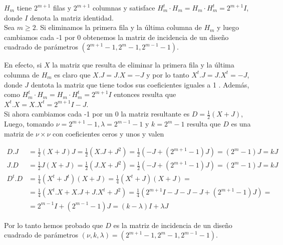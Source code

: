 \documentclass[10pt]{article}
\begin{document}
$H_{m}$ tiene $2^{m+1}$ filas y $2^{m+1}$ columnas y satisface $H_{m}^{t} \cdot H_{m}=H_{m} \cdot H_{m}^{t}=2^{m+1} I$, donde $I$ denota la matriz identidad.\\
Sea $m \geq 2$. Si eliminamos la primera fila y la última columna de $H_{m}$ y luego cambiamos cada -1 por 0 obtenemos la matriz de incidencia de un diseño cuadrado de parámetros $\left(2^{m+1}-1,2^{m}-1,2^{m-1}-1\right)$.

En efecto, si $X$ la matriz que resulta de eliminar la primera fila y la última columna de $H_{m}$ es claro que $X . J=J . X=-J$ y por lo tanto $X^{t} . J=J . X^{t}=-J$, donde $J$ dentota la matriz que tiene todos sus coeficientes iguales a 1 . Además, como $H_{m}^{t} \cdot H_{m}=H_{m} \cdot H_{m}^{t}=2^{m+1} I$ entonces resulta que $X^{t} . X=X . X^{t}=2^{m+1} I-J$.\\
Si ahora cambiamos cada -1 por un 0 la matriz resultante es $D=\frac{1}{2}(X+J)$, Luego, tomando $\nu=2^{m+1}-1, \lambda=2^{m-1}-1$ y $k=2^{m}-1$ resulta que $D$ es una matriz de $\nu \times \nu$ con coeficientes ceros y unos y valen

$$
\begin{aligned}
D . J & =\frac{1}{2}(X+J) J=\frac{1}{2}\left(X . J+J^{2}\right)=\frac{1}{2}\left(-J+\left(2^{m+1}-1\right) J\right)=\left(2^{m}-1\right) J=k J \\
J . D & =\frac{1}{2} J(X+J)=\frac{1}{2}\left(J . X+J^{2}\right)=\frac{1}{2}\left(-J+\left(2^{m+1}-1\right) J\right)=\left(2^{m}-1\right) J=k J \\
D^{t} . D & =\frac{1}{4}\left(X^{t}+J^{t}\right)(X+J)=\frac{1}{4}\left(X^{t}+J\right)(X+J)= \\
& =\frac{1}{4}\left(X^{t} . X+X . J+J . X^{t}+J^{2}\right)=\frac{1}{4}\left(2^{m+1} I-J-J-J+\left(2^{m+1}-1\right) J\right)= \\
& =2^{m-1} I+\left(2^{m-1}-1\right) J=(k-\lambda) I+\lambda J
\end{aligned}
$$

Por lo tanto hemos probado que $D$ es la matriz de incidencia de un diseño cuadrado de parámetros $(\nu, k, \lambda)=\left(2^{m+1}-1,2^{m}-1,2^{m-1}-1\right)$.
\end{document}
